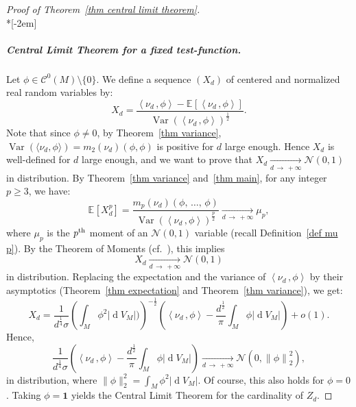 \documentclass[10pt]{amsart}
\theoremstyle{definition}\newtheorem{defi}[theo]{Definition}\newtheorem{rema}[theo]{Remark}\newtheorem{exam}[theo]{Example}\newtheorem{exem}[theo]{Example}\newtheorem{nota}[theo]{Notation}
\DeclareMathOperator{\dmesure}{d}
\DeclareMathOperator{\Var}{Var}
\newcommand{\clN}{\mathcal{N}}
\newcommand{\clC}{\mathcal{C}}
\newcommand{\bfun}{\mathbf{1}}
\newcommand{\esp}[2][]{\mathbb{E}_{#1}\!\left[#2 \right]}
\newcommand{\norm}[1]{\left\lvert #1 \right\rvert}
\newcommand{\Norm}[1]{\left\lVert #1 \right\rVert}
\newcommand{\prsc}[2]{\left\langle #1\,, #2 \right\rangle}
\newcommand{\rmes}[1]{\norm{\dmesure\! V_{#1}}}
\newcommand{\var}[1]{\Var\!\left(#1 \right)}
\renewcommand{\geq}{\geqslant}
\begin{document}
\begin{proof}[{Proof of Theorem~\ref{thm central limit theorem}}]\ \\*[-2em]
\subparagraph*{Central Limit Theorem for a fixed test-function.} Let $\phi \in \clC^0(M)\setminus \{0\}$. We define a sequence $(X_d)$ of centered and normalized real random variables by:
\[
X_d = \frac{\prsc{\nu_d}{\phi} - \esp{\prsc{\nu_d}{\phi}}}{\var{\prsc{\nu_d}{\phi}}^\frac{1}{2}}.
\]
Note that since $\phi \neq 0$, by Theorem~\ref{thm variance}, $\Var(\langle\nu_d,\phi\rangle) = m_2(\nu_d)(\phi,\phi)$ is positive for $d$ large enough. Hence $X_d$ is well-defined for $d$ large enough, and we want to prove that $X_d \xrightarrow[d \,\to\,+\infty]{} \clN(0,1)$ in distribution. By Theorem~\ref{thm variance} and~\ref{thm main}, for any integer $p \geq 3$, we have:
\[
\esp{X_d^p} = \frac{m_p(\nu_d)(\phi,\,\dots,\,\phi)}{\var{\prsc{\nu_d}{\phi}}^\frac{p}{2}} \xrightarrow[d\,\to\,+\infty]{} \mu_p,
\]
where $\mu_p$ is the $p^{\rm th}$ moment of an $\clN(0,1)$ variable (recall Definition~\ref{def mu p}). By the Theorem of Moments (cf.~\cite[Theorem~30.2]{Bil1995}), this implies
\[
X_d \xrightarrow[d\,\to\,+\infty]{}\clN(0,1)
\]
in distribution. Replacing the expectation and the variance of $\prsc{\nu_d}{\phi}$ by their asymptotics (Theorem~\ref{thm expectation} and Theorem~\ref{thm variance}), we get:
\[
X_d = \frac{1}{d^\frac{1}{4}\sigma} \left(\int_M \phi^2 \rmes{M})\right)^{-\frac{1}{2}} \left(\prsc{\nu_d}{\phi}- \frac{d^\frac{1}{2}}{\pi} \int_M \phi \rmes{M}\right) +o(1).
\]
Hence,
\[
\frac{1}{d^\frac{1}{4}\sigma} \left(\prsc{\nu_d}{\phi}- \frac{d^\frac{1}{2}}{\pi} \int_M \phi \rmes{M}\right) \xrightarrow[d\,\to\,+\infty]{} \clN(0,\Norm{\phi}^2_2),
\]
in distribution, where $\|\phi\|_2^2 = \int_M \phi^2 \rmes{M}$. Of course, this also holds for $\phi=0$. Taking $\phi = \bfun$ yields the Central Limit Theorem for the cardinality of $Z_d$.


\end{proof}
\end{document}
